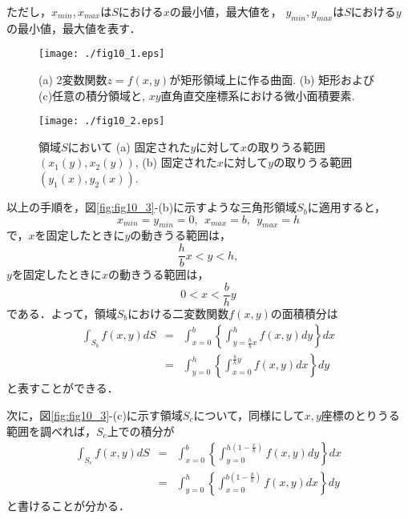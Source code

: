 \documentclass[10pt,a4j]{jbook}
\begin{document}
ただし，$x_{min},x_{max}$は$S$における$x$の最小値，最大値を，
$y_{min},y_{max}$は$S$における$y$の最小値，最大値を表す．
\begin{figure}[h]
	\begin{center}
	\texttt{[image: ./fig10\_1.eps]} 
	\end{center}
	\caption{
		(a) 2変数関数$z=f(x,y)$が矩形領域上に作る曲面. 
		(b) 矩形および(c)任意の積分領域と, $xy$直角直交座標系における微小面積要素. 
	} 
	\label{fig:fig10_1}
\end{figure}
\begin{figure}[h]
	\begin{center}
	\texttt{[image: ./fig10\_2.eps]} 
	\end{center}
	\caption{
		領域$S$において
		(a) 固定された$y$に対して$x$の取りうる範囲$\left(x_1(y),x_2(y)\right)$, 
		(b) 固定された$x$に対して$y$の取りうる範囲$\left(y_1(x),y_2(x)\right)$. 
	} 
	\label{fig:fig10_2}
\end{figure}
以上の手順を，図\ref{fig:fig10_3}-(b)に示すような三角形領域$S_b$に適用すると，
\begin{equation}
	x_{min}=y_{min}=0, \ \ x_{max}=b, \ \ y_{max}=h
\end{equation}
で，$x$を固定したときに$y$の動きうる範囲は，
\begin{equation}
	\frac{h}{b}x < y < h, 
	\label{eqn:ybnd_Sb}
\end{equation}
$y$を固定したときに$x$の動きうる範囲は，
\begin{equation}
	0 < x < \frac{b}{h}y
	\label{eqn:xbnd_Sb}
\end{equation}
である．よって，領域$S_b$における二変数関数$f(x,y)$の面積積分は
\begin{eqnarray}
	\int_{S_b} f(x,y) dS
	&=&
	\int_{x=0}^b \left\{ \int_{y=\frac{h}{b}x}^h f(x,y)dy\right\} dx 
	\label{eqn:int_Sb_yx}
	\\
	&=&
	\int_{y=0}^h \left\{ \int_{x=0}^{\frac{b}{h}y} f(x,y)dx\right\}dy
	\label{eqn:int_Sb_xy}
\end{eqnarray}
と表すことができる．

次に，図\ref{fig:fig10_3}-(c)に示す領域$S_c$について，同様にして$x,y$座標のとりうる範囲を調べれば，$S_c$上での積分が
\begin{eqnarray}
	\int_{S_c} f(x,y) dS
	&=&
	\int_{x=0}^b \left\{ \int_{y=0}^{h\left(1-\frac{x}{b}\right)} f(x,y)dy\right\}dx 
	\label{eqn:int_Sc_yx}
	\\
	&=&
	\int_{y=0}^h \left\{ \int_{x=0}^{b\left(1-\frac{y}{h}\right)} f(x,y)dx\right\} dy
	\label{eqn:int_Sc_xy}
\end{eqnarray}
と書けることが分かる．
\end{document}
